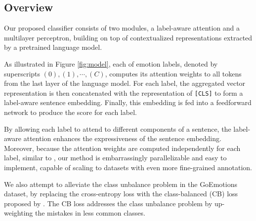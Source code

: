 \subsection{Overview}

Our proposed classifier consists of two modules, a label-aware attention and a multilayer perceptron, building on top of contextualized representations extracted by a pretrained language model. 

As illustrated in Figure \ref{fig:model}, each of emotion labels, denoted by superscripts $(0), (1), \cdots, (C)$, computes its attention weights to all tokens from the last layer of the language model. For each label, the aggregated vector representation is then concatenated with the representation of \texttt{[CLS]} to form a label-aware sentence embedding. Finally, this embedding is fed into a feedforward network to produce the score for each label. 

By allowing each label to attend to different components of a sentence, the label-aware attention enhances the expressiveness of the sentence embedding. Moreover, because the attention weights are computed independently for each label, similar to \citet{vaswani2017attention}, our method is embarrassingly parallelizable and easy to implement, capable of scaling to datasets with even more fine-grained annotation. 

We also attempt to alleviate the class unbalance problem in the GoEmotions dataset, by replacing the cross-entropy loss with the class-balanced (CB) loss proposed by \citet{cui2019classbalanced}. The CB loss addresses the class unbalance problem by up-weighting the mistakes in less common classes. 

